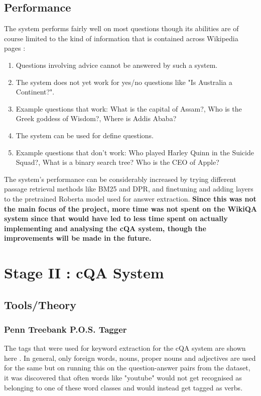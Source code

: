 \documentclass[12pt, a4paper]{article}
\begin{document}
\clearpage
\subsection{Performance} 

The system performs fairly well on most questions though its abilities are of course limited to the kind of information that is contained across Wikipedia pages : 

\begin{enumerate}
    \item Questions involving advice cannot be answered by such a system. 
    \item The system does not yet work for yes/no questions like "Is Australia a Continent?". 
    \item Example questions that work: What is the capital of Assam?, Who is the Greek goddess of Wisdom?, Where is Addis Ababa? 
    \item The system can be used for define questions. 
    \item Example questions that don't work: Who played Harley Quinn in the Suicide Squad?, What is a binary search tree? Who is the CEO of Apple? 
\end{enumerate} 

The system's performance can be considerably increased by trying different passage retrieval methods like BM25 and DPR, and finetuning and adding layers to the pretrained Roberta model used for answer extraction. \textbf{Since this was not the main focus of the project, more time was not spent on the WikiQA system since that would have led to less time spent on actually implementing and analysing the cQA system, though the improvements will be made in the future.}

\newpage 
\section{Stage II : cQA System} 

\subsection{Tools/Theory} 
\subsubsection{Penn Treebank P.O.S. Tagger} 

The tags that were used for keyword extraction for the cQA system are shown here \cite{pos}. In general, only foreign words, nouns, proper nouns and adjectives are used for the same but on running this on the question-answer pairs from the dataset, it was discovered that often words like "youtube" would not get recognised as belonging to one of these word classes and would instead get tagged as verbs. 
\end{document}
